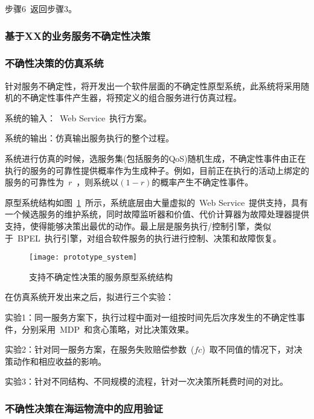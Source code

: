 步骤6~返回步骤3。

\subsubsection{基于XX的业务服务不确定性决策}



\subsubsection{不确性决策的仿真系统}

针对服务不确定性，将开发出一个软件层面的不确定性原型系统，此系统将采用随机的不确定性事件产生器，将预定义的组合服务进行仿真过程。

系统的输入：~Web Service~执行方案。

系统的输出：仿真输出服务执行的整个过程。

系统进行仿真的时候，选服务集(包括服务的QoS)随机生成，不确定性事件由正在执行的服务的可靠性提供概率作为生成种子。例如，目前正在执行的活动上绑定的服务的可靠性为~$r$~，则系统以$(1-r)$的概率产生不确定性事件。

原型系统结构如图~\ref{figure:prototype_system}~所示，系统底层由大量虚拟的~Web Service~提供支持，具有一个候选服务的维护系统，同时故障监听器和价值、代价计算器为故障处理器提供支持，使得能够决策出最优的动作。最上层是服务执行/控制引擎，类似于~BPEL~执行引擎，对组合软件服务的执行进行控制、决策和故障恢复。

\begin{figure}[htbp]
    \centering
    \texttt{[image: prototype\_system]}
    \caption{支持不确定性决策的服务原型系统结构}\label{figure:prototype_system}
    \vspace{-1em}
\end{figure}


在仿真系统开发出来之后，拟进行三个实验：

实验1：同一服务方案下，执行过程中面对一组按时间先后次序发生的不确定性事件，分别采用~MDP~和贪心策略，对比决策效果。

实验2：针对同一服务方案，在服务失败赔偿参数~($fc$)~取不同值的情况下，对决策动作和相应收益的影响。

实验3：针对不同结构、不同规模的流程，针对一次决策所耗费时间的对比。

\subsubsection{不确性决策在海运物流中的应用验证}
\setcounter{paragraph}{0}
